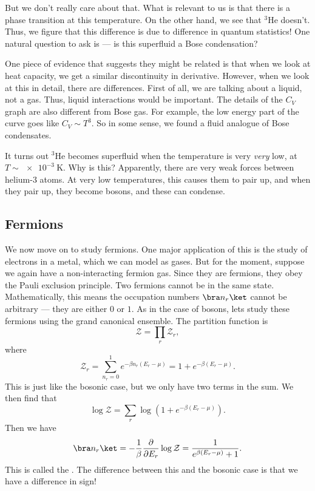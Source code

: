 \documentclass[a4paper]{article}
\begin{document}
But we don't really care about that. What is relevant to us is that there is a phase transition at this temperature. On the other hand, we see that $^3$He doesn't. Thus, we figure that this difference is due to difference in quantum statistics! One natural question to ask is --- is this superfluid a Bose condensation?

One piece of evidence that suggests they might be related is that when we look at heat capacity, we get a similar discontinuity in derivative. However, when we look at this in detail, there are differences. First of all, we are talking about a liquid, not a gas. Thus, liquid interactions would be important. The details of the $C_V$ graph are also different from Bose gas. For example, the low energy part of the curve goes like $C_V \sim T^3$. So in some sense, we found a fluid analogue of Bose condensates.

It turns out $^3$He becomes superfluid when the temperature is very \emph{very} low, at $T \sim \SI{e-3}{\kelvin}$. Why is this? Apparently, there are very weak forces between helium-3 atoms. At very low temperatures, this causes them to pair up, and when they pair up, they become bosons, and these can condense.

\subsection{Fermions}
We now move on to study fermions. One major application of this is the study of electrons in a metal, which we can model as gases. But for the moment, suppose we again have a non-interacting fermion gas. Since they are fermions, they obey the Pauli exclusion principle. Two fermions cannot be in the same state. Mathematically, this means the occupation numbers $\bra n_r\ket$ cannot be arbitrary --- they are either $0$ or $1$. As in the case of bosons, lets study these fermions using the grand canonical ensemble. The partition function is
\[
  \mathcal{Z} = \prod_r \mathcal{Z}_r,
\]
where
\[
  \mathcal{Z}_r = \sum_{n_r = 0}^1 e^{-\beta n_r (E_r - \mu)} = 1 + e^{-\beta (E_r - \mu)}.
\]
This is just like the bosonic case, but we only have two terms in the sum. We then find that
\[
  \log \mathcal{Z} = \sum_r \log (1 + e^{-\beta (E_r - \mu)}).
\]
Then we have
\[
  \bra n_r\ket = -\frac{1}{\beta} \frac{\partial}{\partial E_r} \log \mathcal{Z} = \frac{1}{e^{\beta(E_r - \mu)} + 1}.
\]
This is called the . The difference between this and the bosonic case is that we have a difference in sign!
\end{document}
